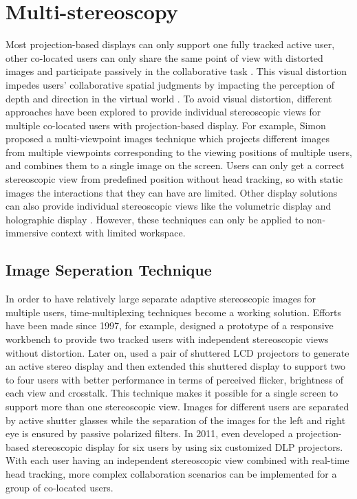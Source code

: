 \section{Multi-stereoscopy}
Most projection-based displays can only support one fully tracked active user, other co-located users can only share the same point of view with distorted images and participate passively in the collaborative task \citep{Bayon2006Multiple}. This visual distortion impedes users' collaborative spatial judgments by impacting the perception of depth and direction in the virtual world \citep{Pollock2012Right}. To avoid visual distortion, different approaches have been explored to provide individual stereoscopic views for multiple co-located users with projection-based display. For example, Simon proposed a multi-viewpoint images technique \citep{Simon2007MVI} which projects different images from multiple viewpoints corresponding to the viewing positions of multiple users, and combines them to a single image on the screen. Users can only get a correct stereoscopic view from predefined position without head tracking, so with static images the interactions that they can have are limited. Other display solutions can also provide individual stereoscopic views like the volumetric display \citep{Grossman2008Volum} and holographic display \citep{Lucente1997Holo}. However, these techniques can only be applied to non-immersive context with limited workspace.

\subsection{Image Seperation Technique}
In order to have relatively large separate adaptive stereoscopic images for multiple users, time-multiplexing techniques become a working solution. Efforts have been made since 1997, for example, \citet{Agrawala1997TRW} designed a prototype of a responsive workbench to provide two tracked users with independent stereoscopic views without distortion. Later on, \citet{Kunz2002TSC} used a pair of shuttered LCD projectors to generate an active stereo display and then \citet{Frohlich2005MultiViewer} extended this shuttered display to support two to four users with better performance in terms of perceived flicker, brightness of each view and crosstalk. This technique makes it possible for a single screen to support more than one stereoscopic view. Images for different users are separated by active shutter glasses while the separation of the images for the left and right eye is ensured by passive polarized filters. In 2011, \citet{Kulik2011CSS} even developed a projection-based stereoscopic display for six users by using six customized DLP projectors. With each user having an independent stereoscopic view combined with real-time head tracking, more complex collaboration scenarios can be implemented for a group of co-located users.

